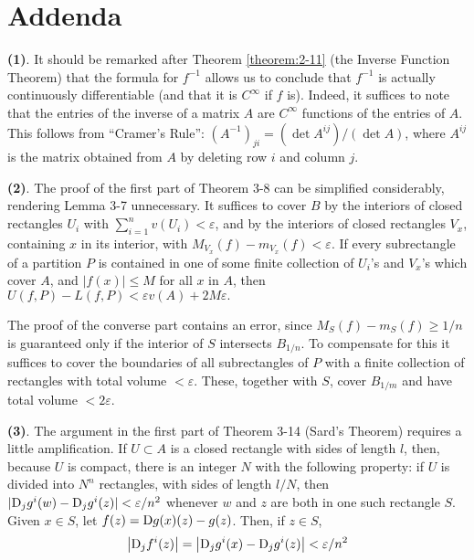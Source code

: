 {\let\cleardoublepage\relax
\chapter*{Addenda}}
\begingroup\normalsize
{}
\textbf{(1)}. It should be remarked after Theorem \ref{theorem:2-11} (the Inverse Function Theorem) 
that the formula for $f^{-1}$ allows us to conclude that $f^{-1}$ is actually continuously 
differentiable (and that it is $C^\infty$ if $f$ is). Indeed, it suffices to note that the 
entries of the inverse of a matrix $A$ are $C^\infty$ functions of the entries of $A$. This 
follows from ``Cramer's Rule'': $(A^{-1})_{ji}=(\det A^{ij})/(\det A)$, where $A^{ij}$ is the 
matrix obtained from $A$ by deleting row $i$ and column $j$.

\vspace*{1.5em}
\textbf{(2)}. The proof of the first part of Theorem 3-8 can be simplified 
considerably, rendering Lemma 3-7 unnecessary. It suffices to cover $B$ by the 
interiors of closed rectangles $U_i$ with $\sum_{i=1}^{n}{v(U_i)}<\varepsilon$, and 
by the interiors of closed rectangles $V_x$, containing $x$ in its interior, with 
$M_{V_x}(f)-m_{V_x}(f)<\varepsilon$. If every subrectangle of a partition $P$ is 
contained in one of some finite collection of $U_i$'s and $V_x$'s which
cover $A$, and $|f(x)|\le M$ for all $x$ in $A$, then $U(f, P) - L(f, P)
<\varepsilon v(A)+2M\varepsilon.$

The proof of the converse part contains an error, since
$M_S(f)-m_S(f)\ge 1/n$ is guaranteed only if the interior of $S$
intersects $B_{1/n}$. To compensate for this it suffices to cover the
boundaries of all subrectangles of $P$ with a finite collection of
rectangles with total volume $< \varepsilon$. These, together with $S$,
cover $B_{1/m}$ and have total volume $< 2\varepsilon$.

\vspace*{1.5em}
\textbf{(3)}. The argument in the first part of Theorem 3-14 (Sard's Theorem) requires 
a little amplification. If $U\subset A$ is a closed rectangle with sides of length $l$, 
then, because $U$ is compact, there is an integer $N$ with the following property: if $U$ 
is divided into $N^n$ rectangles, with sides of length $l/N$, then $|\mathrm{D}_jg^i(w) - \mathrm{D}_jg^i(z)|<\varepsilon/n^2$
whenever $w$ and $z$ are both in one such rectangle $S$. Given $x\in S$, let $f(z)=\mathrm{D}g(x)(z)-g(z)$.
Then, if $z\in S$,
\begin{align*}
    \left|\mathrm{D}_jf^i(z)\right|=\left|\mathrm{D}_jg^i(x)-\mathrm{D}_jg^i(z)\right|<\varepsilon/n^2
\end{align*}

